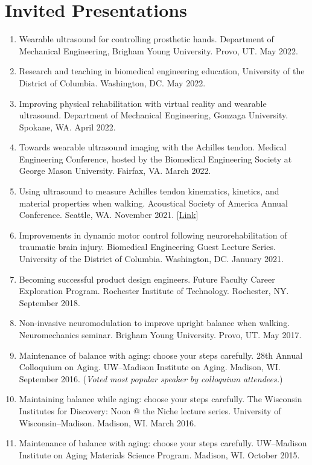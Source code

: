 \documentclass[letterpaper, 10pt]{article}
\begin{document}
\section{Invited Presentations}
\begin{enumerate}
    \item  Wearable ultrasound for controlling prosthetic hands. Department of Mechanical Engineering, Brigham Young University. Provo, UT. May 2022.
    \item  Research and teaching in biomedical engineering education, University of the District of Columbia. Washington, DC. May 2022.
    \item  Improving physical rehabilitation with virtual reality and wearable ultrasound. Department of Mechanical Engineering, Gonzaga University. Spokane, WA. April 2022.
    \item  Towards wearable ultrasound imaging with the Achilles tendon. Medical Engineering Conference, hosted by the Biomedical Engineering Society at George Mason University. Fairfax, VA. March 2022.
    \item  Using ultrasound to measure Achilles tendon kinematics, kinetics, and material properties when walking. Acoustical Society of America Annual Conference. Seattle, WA. November 2021. [\href{https://asa.scitation.org/doi/10.1121/10.0008319}{Link}]
    \item  Improvements in dynamic motor control following neurorehabilitation of traumatic brain injury. Biomedical Engineering Guest Lecture Series. University of the District of Columbia. Washington, DC. January 2021.
    \item  Becoming successful product design engineers. Future Faculty Career Exploration Program. Rochester Institute of Technology. Rochester, NY. September 2018.
    \item  Non-invasive neuromodulation to improve upright balance when walking. Neuromechanics seminar. Brigham Young University. Provo, UT. May 2017.
    \item  Maintenance of balance with aging: choose your steps carefully. 28th Annual Colloquium on Aging. UW--Madison Institute on Aging. Madison, WI. September 2016. (\textit{Voted most popular speaker by colloquium attendees.})
    \item  Maintaining balance while aging: choose your steps carefully. The Wisconsin Institutes for Discovery: Noon @ the Niche lecture series. University of Wisconsin--Madison. Madison, WI. March 2016.
    \item Maintenance of balance with aging: choose your steps carefully. UW--Madison Institute on Aging Materials Science Program. Madison, WI. October 2015.
\end{enumerate}
\end{document}
